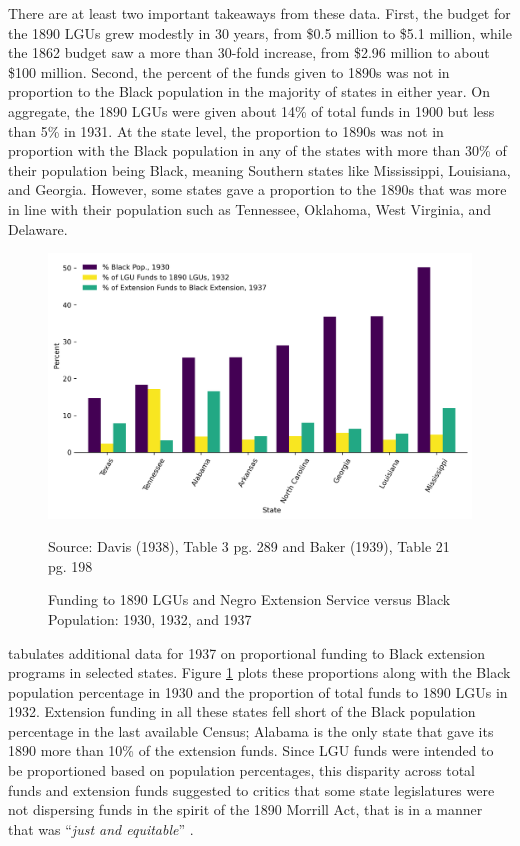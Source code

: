 \documentclass[12pt]{article}
\begin{document}
There are at least two important takeaways from these data.
First, the budget for the 1890 LGUs grew modestly in 30 years, from \$0.5 million to \$5.1 million, while the 1862 budget saw a more than 30-fold increase, from \$2.96 million to about \$100 million.
Second, the percent of the funds given to 1890s was not in proportion to the Black population in the majority of states in either year.
On aggregate, the 1890 LGUs were given about 14\% of total funds in 1900 but less than 5\% in 1931.
At the state level, the proportion to 1890s was not in proportion with the Black population in any of the states with more than 30\% of their population being Black, meaning Southern states like Mississippi, Louisiana, and Georgia.
However, some states gave a proportion to the 1890s that was more in line with their population such as Tennessee, Oklahoma, West Virginia, and Delaware.


\begin{figure}
\caption{Funding to 1890 LGUs and Negro Extension Service versus Black Population: 1930, 1932, and 1937}
\label{1890funds_ext}
\centering
    \includegraphics[width=.9\textwidth]{figs/Figure3.png}

Source: Davis (1938), Table 3 pg. 289 and Baker (1939), Table 21 pg. 198 

\end{figure}

\citet{baker_negro_1939} tabulates additional data for 1937 on proportional funding to Black extension programs in selected states.
Figure \ref{1890funds_ext} plots these proportions along with the Black population percentage in 1930 and the proportion of total funds to 1890 LGUs in 1932.
Extension funding in all these states fell short of the Black population percentage in the last available Census; Alabama is the only state that gave its 1890 more than 10\% of the extension funds.
Since LGU funds were intended to be proportioned based on population percentages, this disparity across total funds and extension funds suggested to critics that some state legislatures were not dispersing funds in the spirit of the 1890 Morrill Act, that is in a manner that was ``\textit{just and equitable}'' \citep{davis_participation_1938,wilkerson_agricultural_1942}.
 
\end{document}
